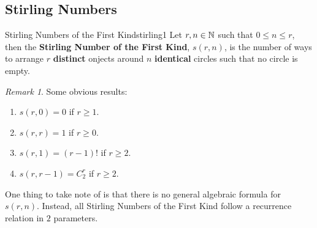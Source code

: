 \documentclass[math]{amznotes}
\theoremstyle{remark}
\newtheorem*{remark}{Remark}
\begin{document}
\subsection{Stirling Numbers}
\begin{dfnbox}{Stirling Numbers of the First Kind}{stirling1}
    Let $r, n \in \mathbb{N}$ such that $0 \leq n \leq r$, then the {\color{red} \textbf{Stirling Number of the First Kind}}, $s(r, n)$, is the number of ways to arrange $r$ {\color{red} \textbf{distinct}} onjects around $n$ {\color{red} \textbf{identical}} circles such that no circle is empty.
\end{dfnbox}
\begin{notebox}
    \begin{remark}
        Some obvious results:
        \begin{enumerate}
            \item $s(r, 0) = 0$ if $r \geq 1$.
            \item $s(r, r) = 1$ if $r \geq 0$.
            \item $s(r, 1) = (r - 1)!$ if $r \geq 2$.
            \item $s(r, r - 1) = C^r_2$ if $r \geq 2$.
        \end{enumerate}
    \end{remark}
\end{notebox}
One thing to take note of is that there is no general algebraic formula for $s(r, n)$. Instead, all Stirling Numbers of the First Kind follow a recurrence relation in $2$ parameters.
\end{document}

